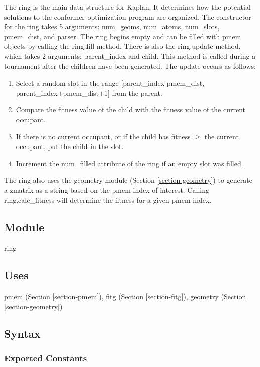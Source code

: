 \documentclass[12pt, titlepage]{article}
\newcommand{\progname}{Kaplan}
\begin{document}
The ring is the main data structure for \progname{}. It determines how the 
potential solutions to the conformer optimization program are organized. The 
constructor for the ring takes 5 arguments: num\_geoms, num\_atoms, num\_slots, 
pmem\_dist, and parser. The ring begins empty and can be filled with pmem 
objects by calling the ring.fill method. There is also the ring.update method, 
which takes 2 arguments: parent\_index and child. This method is called during 
a tournament after the children have been generated. The update occurs as 
follows:
\begin{enumerate}
	\item Select a random slot in the range [parent\_index-pmem\_dist, 
	parent\_index+pmem\_dist+1] from 
	the parent.
	\item Compare the fitness value of the child with the fitness value of the 
	current occupant.
	\item If there is no current occupant, or if the child has fitness $\geq$ 
	the current occupant, put the child in the slot.
	\item Increment the num\_filled attribute of the ring if an empty slot was 
	filled.
\end{enumerate}
The ring also uses the geometry module (Section \ref{section-geometry}) to 
generate a zmatrix as a string based on the pmem index of interest. Calling 
ring.calc\_fitness will determine the fitness for a given pmem index.

\subsection{Module}

ring

\subsection{Uses}

pmem (Section \ref{section-pmem}),
fitg (Section \ref{section-fitg}),
geometry (Section \ref{section-geometry})

\subsection{Syntax}

\subsubsection{Exported Constants}
\end{document}

